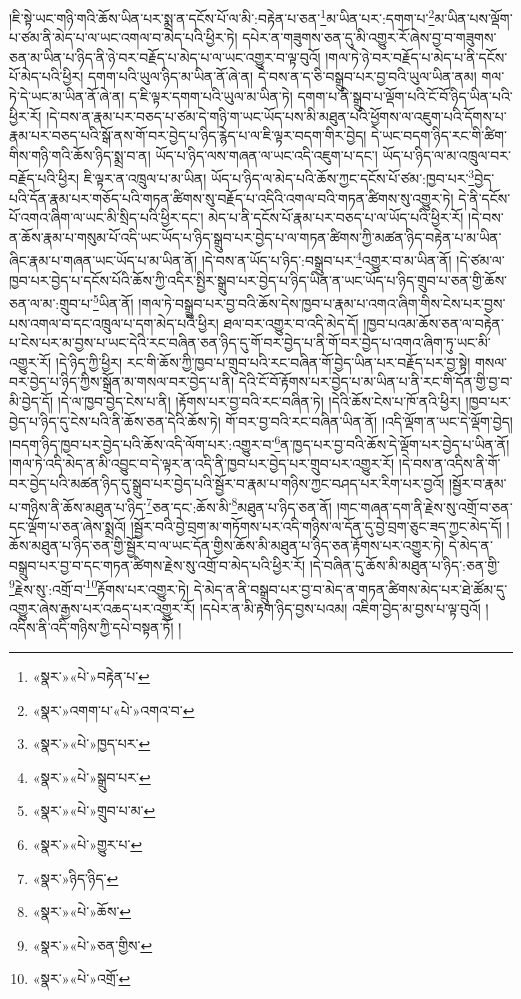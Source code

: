 །ཇི་སྟེ་ཡང་གཉི་གའི་ཆོས་ཡིན་པར་སྨྲ་ན་དངོས་པོ་ལ་མི་:བརྟེན་པ་ཅན་\footnote{«སྣར་»«པེ་»བརྟེན་པ་}མ་ཡིན་པར་:དགག་པ་\footnote{«སྣར་»འགག་པ་«པེ་»འགའ་བ་}མ་ཡིན་པས་ལྡོག་པ་ཙམ་ནི་མེད་པ་ལ་ཡང་འགལ་བ་མེད་པའི་ཕྱིར་ཏེ། དཔེར་ན་གཟུགས་ཅན་དུ་མི་འགྱུར་རོ་ཞེས་བྱ་བ་གཟུགས་ཅན་མ་ཡིན་པ་ཉིད་ནི་ཉེ་བར་བརྗོད་པ་མེད་པ་ལ་ཡང་འགྱུར་བ་ལྟ་བུའོ། །གལ་ཏེ་ཉེ་བར་བརྗོད་པ་མེད་པ་ནི་དངོས་པོ་མེད་པའི་ཕྱིར། དགག་པའི་ཡུལ་ཉིད་མ་ཡིན་ནོ་ཞེ་ན། དེ་བས་ན་ད་ཅི་བསྒྲུབ་པར་བྱ་བའི་ཡུལ་ཡིན་ནམ། གལ་ཏེ་དེ་ཡང་མ་ཡིན་ནོ་ཞེ་ན། ད་ཇི་ལྟར་དགག་པའི་ཡུལ་མ་ཡིན་ཏེ། དགག་པ་ནི་སྒྲུབ་པ་ལྡོག་པའི་ངོ་བོ་ཉིད་ཡིན་པའི་ཕྱིར་རོ། །དེ་བས་ན་རྣམ་པར་བཅད་པ་ཙམ་དེ་གཉི་ག་ཡང་ཡོད་པས་མི་མཐུན་པའི་ཕྱོགས་ལ་འཇུག་པའི་དོགས་པ་རྣམ་པར་བཅད་པའི་སྒོ་ནས་གོ་བར་བྱེད་པ་ཉིད་རྙེད་པ་ལ་ཇི་ལྟར་བདག་གིར་བྱེད། དེ་ཡང་བདག་ཉིད་རང་གི་ཚིག་གིས་གཉི་གའི་ཆོས་ཉིད་སྨྲ་བ་ན། ཡོད་པ་ཉིད་ལས་གཞན་ལ་ཡང་འདི་འཇུག་པ་དང་། ཡོད་པ་ཉིད་ལ་མ་འཁྲུལ་བར་བརྗོད་པའི་ཕྱིར། ཇི་ལྟར་ན་འཁྲུལ་པ་མ་ཡིན། ཡོད་པ་ཉིད་ལ་མེད་པའི་ཆོས་ཀྱང་དངོས་པོ་ཙམ་:ཁྱབ་པར་\footnote{«སྣར་»«པེ་»ཁྱད་པར་}བྱེད་པའི་དོན་རྣམ་པར་གཅོད་པའི་གཏན་ཚིགས་སུ་བརྗོད་པ་འདིའི་འགལ་བའི་གཏན་ཚིགས་སུ་འགྱུར་ཏེ། དེ་ནི་དངོས་པོ་འགའ་ཞིག་ལ་ཡང་མི་སྲིད་པའི་ཕྱིར་དང་། མེད་པ་ནི་དངོས་པོ་རྣམ་པར་བཅད་པ་ལ་ཡོད་པའི་ཕྱིར་རོ། །དེ་བས་ན་ཆོས་རྣམ་པ་གསུམ་པོ་འདི་ཡང་ཡོད་པ་ཉིད་སྒྲུབ་པར་བྱེད་པ་ལ་གཏན་ཚིགས་ཀྱི་མཚན་ཉིད་བརྟེན་པ་མ་ཡིན་ཞིང་རྣམ་པ་གཞན་ཡང་ཡོད་པ་མ་ཡིན་ནོ། །དེ་བས་ན་ཡོད་པ་ཉིད་:བསྒྲུབ་པར་\footnote{«སྣར་»«པེ་»སྒྲུབ་པར་}འགྱུར་བ་མ་ཡིན་ནོ། །དེ་ཙམ་ལ་ཁྱབ་པར་བྱེད་པ་དངོས་པོའི་ཆོས་ཀྱི་འདིར་སྤྱིར་སྒྲུབ་པར་བྱེད་པ་ཉིད་ཡིན་ན་ཡང་ཡོད་པ་ཉིད་གྲུབ་པ་ཅན་གྱི་ཆོས་ཅན་ལ་མ་:གྲུབ་པ་\footnote{«སྣར་»«པེ་»གྲུབ་པ་མ་}ཡིན་ནོ། །གལ་ཏེ་བསྒྲུབ་པར་བྱ་བའི་ཆོས་དེས་ཁྱབ་པ་རྣམ་པ་འགའ་ཞིག་གིས་ངེས་པར་བྱས་པས་འགལ་བ་དང་འཁྲུལ་པ་དག་མེད་པའི་ཕྱིར། ཐལ་བར་འགྱུར་བ་འདི་མེད་དོ། །ཁྱབ་པའམ་ཆོས་ཅན་ལ་བརྟེན་པ་ངེས་པར་མ་བྱས་པ་ཡང་དེའི་རང་བཞིན་ཅན་ཉིད་དུ་གོ་བར་བྱེད་པ་ནི་གོ་བར་བྱེད་པ་འགའ་ཞིག་ཏུ་ཡང་མི་འགྱུར་རོ། །དེ་ཉིད་ཀྱི་ཕྱིར། རང་གི་ཆོས་ཀྱི་ཁྱབ་པ་གྲུབ་པའི་རང་བཞིན་གོ་བྱེད་ཡིན་པར་བརྗོད་པར་བྱ་སྟེ། གསལ་བར་བྱེད་པ་ཉིད་ཀྱིས་སྒྲོན་མ་གསལ་བར་བྱེད་པ་ནི། དེའི་ངོ་བོ་རྟོགས་པར་བྱེད་པ་མ་ཡིན་པ་ནི་རང་གི་དོན་གྱི་བྱ་བ་མི་བྱེད་དོ། །དེ་ལ་ཁྱབ་བྱེད་ངེས་པ་ནི། །རྟོགས་པར་བྱ་བའི་རང་བཞིན་ཏེ། །དེའི་ཆོས་ངེས་པ་ཁོ་ནའི་ཕྱིར། །ཁྱབ་པར་བྱེད་པ་ཉིད་དུ་ངེས་པའི་ནི་ཆོས་ཅན་དེའི་ཆོས་ཏེ། གོ་བར་བྱ་བའི་རང་བཞིན་ཡིན་ནོ། །འདི་ལྡོག་ན་ཡང་དེ་ལྡོག་བྱེད། །བདག་ཉིད་ཁྱབ་པར་བྱེད་པའི་ཆོས་འདི་ལོག་པར་:འགྱུར་བ་\footnote{«སྣར་»«པེ་»གྱུར་པ་}ན་ཁྱད་པར་བྱ་བའི་ཆོས་དེ་ལྡོག་པར་བྱེད་པ་ཡིན་ནོ། །གལ་ཏེ་འདི་མེད་ན་མི་འབྱུང་བ་དེ་ལྟར་ན་འདི་ནི་ཁྱབ་པར་བྱེད་པར་གྲུབ་པར་འགྱུར་རོ། །དེ་བས་ན་འདིས་ནི་གོ་བར་བྱེད་པའི་མཚན་ཉིད་དུ་སྒྲུབ་པར་བྱེད་པའི་སྦྱོར་བ་རྣམ་པ་གཉིས་ཀྱང་བཤད་པར་རིག་པར་བྱའོ། །སྦྱོར་བ་རྣམ་པ་གཉིས་ནི་ཆོས་མཐུན་པ་ཉིད་\footnote{«སྣར་»ཉིད་ཉིད་}ཅན་དང་:ཆོས་མི་\footnote{«སྣར་»«པེ་»ཆོས་}མཐུན་པ་ཉིད་ཅན་ནོ། །གང་གཞན་དག་ནི་རྗེས་སུ་འགྲོ་བ་ཅན་དང་ལྡོག་པ་ཅན་ཞེས་སྨྲའོ། །སྦྱོར་བའི་བྱེ་བྲག་མ་གཏོགས་པར་འདི་གཉིས་ལ་དོན་དུ་བྱེ་བྲག་ཅུང་ཟད་ཀྱང་མེད་དོ། །ཆོས་མཐུན་པ་ཉིད་ཅན་གྱི་སྦྱོར་བ་ལ་ཡང་དོན་གྱིས་ཆོས་མི་མཐུན་པ་ཉིད་ཅན་རྟོགས་པར་འགྱུར་ཏེ། དེ་མེད་ན་བསྒྲུབ་པར་བྱ་བ་དང་གཏན་ཚིགས་རྗེས་སུ་འགྲོ་བ་མེད་པའི་ཕྱིར་རོ། །དེ་བཞིན་དུ་ཆོས་མི་མཐུན་པ་ཉིད་:ཅན་གྱི་\footnote{«སྣར་»«པེ་»ཅན་གྱིས་}རྗེས་སུ་:འགྲོ་བ་\footnote{«སྣར་»«པེ་»འགྲོ་}རྟོགས་པར་འགྱུར་ཏེ། དེ་མེད་ན་ནི་བསྒྲུབ་པར་བྱ་བ་མེད་ན་གཏན་ཚིགས་མེད་པར་ཐེ་ཚོམ་དུ་འགྱུར་ཞེས་རྒྱས་པར་འཆད་པར་འགྱུར་རོ། །དཔེར་ན་མི་རྟག་ཉིད་བྱས་པའམ། འཇིག་བྱེད་མ་བྱས་པ་ལྟ་བུའོ། །འདིས་ནི་འདི་གཉིས་ཀྱི་དཔེ་བསྟན་ཏོ། །
